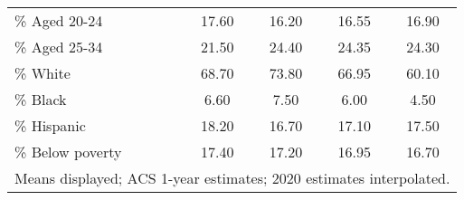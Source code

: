 \begin{table}[htbp]
\begin{adjustbox}{max width=\linewidth}
\begin{tabular}{l*{4}{c}}
\% Aged 20-24       &       17.60&       16.20&       16.55&       16.90\\
\% Aged 25-34       &       21.50&       24.40&       24.35&       24.30\\
\% White            &       68.70&       73.80&       66.95&       60.10\\
\% Black            &        6.60&        7.50&        6.00&        4.50\\
\% Hispanic         &       18.20&       16.70&       17.10&       17.50\\
\% Below poverty    &       17.40&       17.20&       16.95&       16.70\\
\bottomrule
\multicolumn{5}{l}{\footnotesize Means displayed; ACS 1-year estimates; 2020 estimates interpolated.}\\
\end{tabular} \end{adjustbox}
\end{table}
